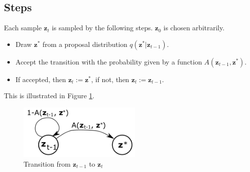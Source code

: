 \documentclass[a4]{article}
\begin{document}
\subsection{Steps}
Each sample $\bm{z}_t$ is sampled by the following steps. $\bm{z}_0$ is chosen arbitrarily.
\begin{itemize}
\item Draw $\bm{z}^*$ from a proposal distribution $q(\bm{z}^*|\bm{z}_{t-1})$.
\item Accept the transition with the probability given by a function $A\left(\bm{z}_{t-1}, \bm{z}^*\right)$.
\item If accepted, then $\bm{z}_{t}:= \bm{z}^*$, if not, then $\bm{z}_{t}:= \bm{z}_{t-1}$.
\end{itemize}
This is illustrated in Figure \ref{fig:mcmc_accept}.
\begin{figure}
\centering
\includegraphics[width=6cm]{mcmc_accept.png}
\caption{Transition from $\bm{z}_{t-1}$ to $\bm{z}_t$}
\label{fig:mcmc_accept}
\end{figure}
\end{document}
